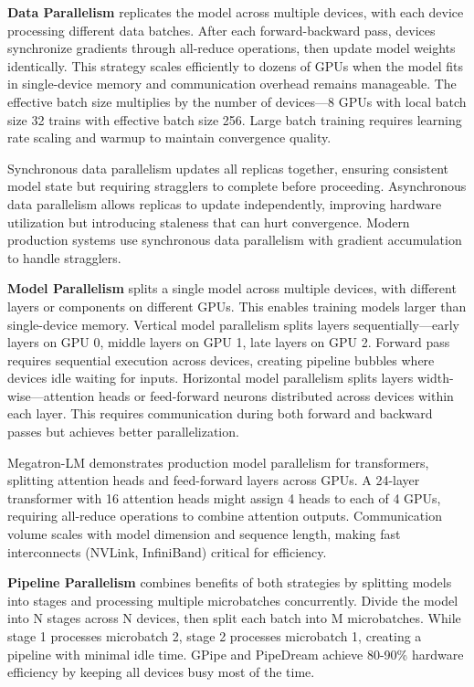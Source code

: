 \textbf{Data Parallelism} replicates the model across multiple devices, with each device processing different data batches. After each forward-backward pass, devices synchronize gradients through all-reduce operations, then update model weights identically. This strategy scales efficiently to dozens of GPUs when the model fits in single-device memory and communication overhead remains manageable. The effective batch size multiplies by the number of devices---8 GPUs with local batch size 32 trains with effective batch size 256. Large batch training requires learning rate scaling and warmup to maintain convergence quality.

Synchronous data parallelism updates all replicas together, ensuring consistent model state but requiring stragglers to complete before proceeding. Asynchronous data parallelism allows replicas to update independently, improving hardware utilization but introducing staleness that can hurt convergence. Modern production systems use synchronous data parallelism with gradient accumulation to handle stragglers.

\textbf{Model Parallelism} splits a single model across multiple devices, with different layers or components on different GPUs. This enables training models larger than single-device memory. Vertical model parallelism splits layers sequentially---early layers on GPU 0, middle layers on GPU 1, late layers on GPU 2. Forward pass requires sequential execution across devices, creating pipeline bubbles where devices idle waiting for inputs. Horizontal model parallelism splits layers width-wise---attention heads or feed-forward neurons distributed across devices within each layer. This requires communication during both forward and backward passes but achieves better parallelization.

Megatron-LM demonstrates production model parallelism for transformers, splitting attention heads and feed-forward layers across GPUs. A 24-layer transformer with 16 attention heads might assign 4 heads to each of 4 GPUs, requiring all-reduce operations to combine attention outputs. Communication volume scales with model dimension and sequence length, making fast interconnects (NVLink, InfiniBand) critical for efficiency.

\textbf{Pipeline Parallelism} combines benefits of both strategies by splitting models into stages and processing multiple microbatches concurrently. Divide the model into N stages across N devices, then split each batch into M microbatches. While stage 1 processes microbatch 2, stage 2 processes microbatch 1, creating a pipeline with minimal idle time. GPipe and PipeDream achieve 80-90\% hardware efficiency by keeping all devices busy most of the time.

